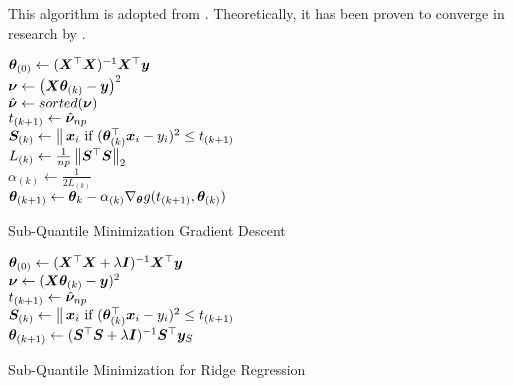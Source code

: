 \documentclass{article} %
\newcommand{\norm}[1]{\left\lVert#1\right\rVert}
\DeclareMathOperator*{\concat}{%
	\mathchoice%
	{\Big\Vert}%
	{\big\Vert}%
	{\Vert}%
	{\Vert}%
}
\begin{document}
	This algorithm is adopted from \cite{Razaviyayn}. Theoretically, it has been proven to converge in research by \cite{Jin_2019}.\\
	\begin{minipage}{0.48\textwidth}
	\begin{algorithm}[H]
		\DontPrintSemicolon
		
		${\bm{\theta}}_{(0)} \gets ({\bm{X}}^\top{\bm{X}})^{-1}{\bm{X}}^\top{\bm{y}}$\\
		{
			$\displaystyle {\bm{\nu}} \gets \left({\bm{X}}{\bm{\theta}}_{(k)} - {\bm{y}}\right)^2$\\
			{
				$\hat{{\bm{\nu}}} \gets sorted({\bm{\nu}})$\\
				$\displaystyle t_{(k+1)} \gets \hat{{\bm{\nu}}}_{np}$\\
			}
			$\mS_{(k)} \gets \concat \vx_i\text{ if } (\vtheta_{(k)}^\top \vx_i - y_i)^2 \leq t_{(k+1)}$\\
			$L_{(k)} \gets \frac{1}{np}\norm{\mS^\top\mS}_2$\\
			$\alpha_{(k)} \gets \frac{1}{2L_{(k)}}$\\
			$\displaystyle {\bm{\theta}}_{(k+1)} \gets {\bm{\theta}}_k - \alpha_{(k)} \nabla_{\bm{\theta}} g(t_{(k+1)},{\bm{\theta}}_{(k)})$
		}
		\caption{Sub-Quantile Minimization Gradient Descent}
		\label{alg:sqo1}
	\end{algorithm}
	\end{minipage}
	\hfill
	\begin{minipage}{0.48\textwidth}
		\begin{algorithm}[H]
			${\bm{\theta}}_{(0)} \gets ({\bm{X}}^\top{\bm{X}} + \lambda{\bm{I}})^{-1}{\bm{X}}^\top{\bm{y}}$\\
			{
				${\bm{\nu}} \gets ({\bm{X}} {\bm{\theta}}_{(k)} - {\bm{y}})^2$\\
				$t_{(k+1)} \gets \hat{{\bm{\nu}}}_{np}$\\
				$\mS_{(k)} \gets \concat \vx_i\text{ if } (\vtheta_{(k)}^\top \vx_i - y_i)^2 \leq t_{(k+1)}$\\
				${\bm{\theta}}_{(k+1)} \gets ({\bm{S}}^\top{\bm{S}} + \lambda{\bm{I}})^{-1}{\bm{S}}^\top{\bm{y}}_S$\\
			}
			\caption{Sub-Quantile Minimization for Ridge Regression}
			\label{alg:sqo-ridge}
		\end{algorithm}
	\end{minipage}
		
\end{document}
